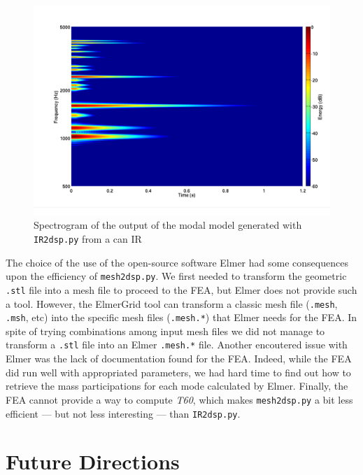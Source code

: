 \documentclass[11pt,a4paper]{article}
\begin{document}
\begin{figure}[htbp]
	\centering
	\includegraphics[width=\columnwidth]{pictures/canModalModel.pdf}
	\caption{Spectrogram of the output of the modal model generated with \texttt{IR2dsp.py} from a can IR}
	\label{fig:spectro2}	
\end{figure}

The choice of the use of the open-source software Elmer had some consequences upon the efficiency of \texttt{mesh2dsp.py}. We first needed to transform the geometric \texttt{.stl} file into a mesh file to proceed to the FEA, but Elmer does not provide such a tool. However, the ElmerGrid tool can transform a classic mesh file (\texttt{.mesh}, \texttt{.msh}, etc) into the specific mesh files (\texttt{.mesh.*}) that Elmer needs for the FEA. In spite of trying combinations among input mesh files we did not manage to transform a \texttt{.stl} file into an Elmer \texttt{.mesh.*} file.
Another encoutered issue with Elmer was the lack of documentation found for the FEA. Indeed, while the FEA did run well with appropriated parameters, we had hard time to find out how to retrieve the mass participations for each mode calculated by Elmer. Finally, the FEA cannot provide a way to compute \textit{T60}, which makes \texttt{mesh2dsp.py} a bit less efficient --- but not less interesting --- than \texttt{IR2dsp.py}.

\section{Future Directions}
\label{sec:future}
\end{document}
